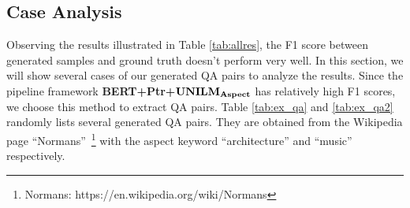 \subsection{Case Analysis}
\label{sec:analysis}
Observing the results illustrated in Table \ref{tab:allres}, the F1 score between generated samples and ground truth doesn't perform very well. 
In this section, we will show several cases of our generated QA pairs to analyze the results.
Since the pipeline framework \textbf{BERT+Ptr+}$\text{\textbf{UNILM}}_{\text{\textbf{Aspect}}}$ has relatively high F1 scores, we choose this method to extract QA pairs.
Table \ref{tab:ex_qa} and \ref{tab:ex_qa2} randomly lists several generated QA pairs.
They are obtained from the Wikipedia page ``Normans''~\footnote{Normans: https://en.wikipedia.org/wiki/Normans} with the aspect keyword ``architecture'' and ``music'' respectively.

